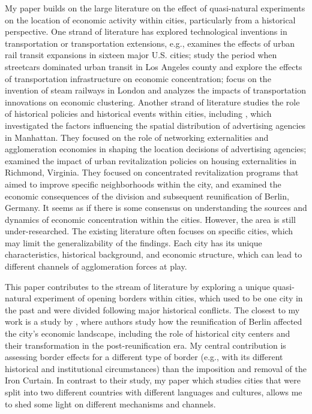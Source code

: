 \documentclass[12pt]{article}    %
\begin{document}
\par My paper builds on the large literature on the effect of quasi-natural experiments on the location of economic activity within cities, particularly from a historical perspective. One strand of literature has explored technological inventions in transportation or transportation extensions, e.g.,  \cite{baum2005effects} examines the effects of urban rail transit expansions in sixteen major U.S. cities; \cite{brooks2019vestiges} study the period when streetcars dominated urban transit in Los Angeles county and explore the effects of transportation infrastructure on economic concentration; \cite{heblich2020making} focus on the invention of steam railways in London and analyzes the impacts of transportation innovations on economic clustering. Another strand of literature studies the role of historical policies and historical events within cities, including \cite{arzaghi2008networking}, which investigated the factors influencing the spatial distribution of advertising agencies in Manhattan. They focused on the role of networking externalities and agglomeration economies in shaping the location decisions of advertising agencies; \cite{rossi2010housing} examined the impact of urban revitalization policies on housing externalities in Richmond, Virginia. They focused on concentrated revitalization programs that aimed to improve specific neighborhoods within the city, and \cite{ahlfeldt2015economics} examined the economic consequences of the division and subsequent reunification of Berlin, Germany. It seems as if there is some consensus on understanding the sources and dynamics of economic concentration within the cities. However, the area is still under-researched. The existing literature often focuses on specific cities, which may limit the generalizability of the findings. Each city has its unique characteristics, historical background, and economic structure, which can lead to different channels of agglomeration forces at play. 


\par This paper contributes to the stream of literature by exploring a unique quasi-natural experiment of opening borders within cities, which used to be  one city in the past and were divided following major historical conflicts. The closest to my work is a study by \cite{ahlfeldt2015economics}, where authors study how the reunification of Berlin affected the city’s economic landscape, including
the role of historical city centers and their transformation in the post-reunification era.
My central contribution is assessing border effects for a different type of border (e.g., with its different historical and institutional circumstances) than the imposition and removal of the Iron Curtain. In contrast to their study, my paper which studies cities that were split into two different countries with different languages and cultures, allows me to shed some light on different mechanisms and channels. 
\end{document}
